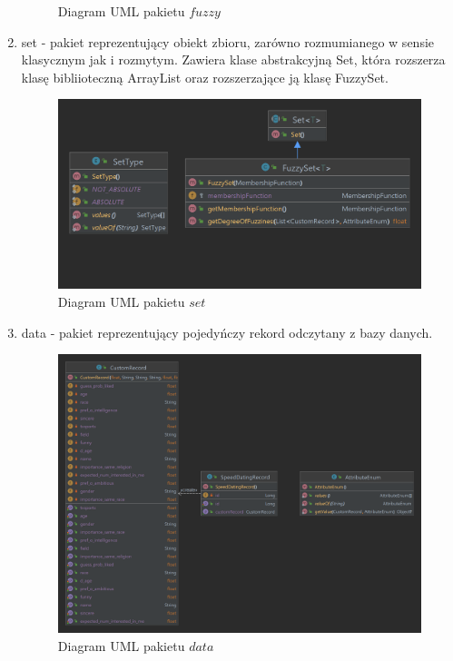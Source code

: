 \documentclass{classrep}
\begin{document}
\begin{enumerate}
\begin{figure}[H]
    \caption{Diagram UML pakietu \(fuzzy\)}
  \end{figure}
  \item set - pakiet reprezentujący obiekt zbioru, zarówno rozmumianego w sensie klasycznym jak i rozmytym. Zawiera klase abstrakcyjną Set, która rozszerza klasę bibliioteczną ArrayList oraz rozszerzające ją klasę FuzzySet.
  \begin{figure}[H]
    \centering
    \includegraphics[scale = 0.2]{set}
    \caption{Diagram UML pakietu \(set\)}
  \end{figure}
  \item data - pakiet reprezentujący pojedyńczy rekord odczytany z bazy danych.
   \begin{figure}[H]
    \centering
    \includegraphics[scale = 0.2]{data}
    \caption{Diagram UML pakietu \(data\)}
  \end{figure}
\end{enumerate}
\end{document}
